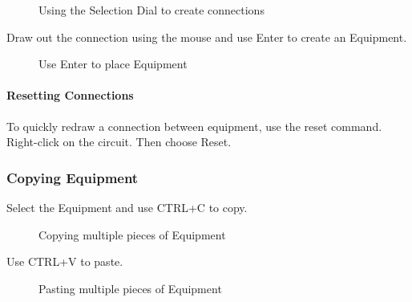 \documentclass[letterpaper,10pt,english]{sphinxmanual}
\begin{document}
\begin{figure}[H]
\centering
\capstart

\noindent{}
\caption{Using the Selection Dial to create connections}\label{\detokenize{docs/userguide/buildingelectricalmodel/riser/index-riser:id20}}\end{figure}

Draw out the connection using the mouse and use Enter to create an Equipment.

\begin{figure}[H]
\centering
\capstart

\noindent{}
\caption{Use Enter to place Equipment}\label{\detokenize{docs/userguide/buildingelectricalmodel/riser/index-riser:id21}}\end{figure}


\paragraph{Resetting Connections}
\label{\detokenize{docs/userguide/buildingelectricalmodel/riser/index-riser:resetting-connections}}
To quickly redraw a connection between equipment, use the reset command.  Right-click on the circuit.  Then choose Reset.


\subsubsection{Copying Equipment}
\label{\detokenize{docs/userguide/buildingelectricalmodel/riser/index-riser:copying-equipment}}
Select the Equipment and use CTRL+C to copy.

\begin{figure}[H]
\centering
\capstart

\noindent{}
\caption{Copying multiple pieces of Equipment}\label{\detokenize{docs/userguide/buildingelectricalmodel/riser/index-riser:id22}}\end{figure}

Use CTRL+V to paste.

\begin{figure}[H]
\centering
\capstart

\noindent{}
\caption{Pasting multiple pieces of Equipment}\label{\detokenize{docs/userguide/buildingelectricalmodel/riser/index-riser:id23}}\end{figure}
\end{document}
